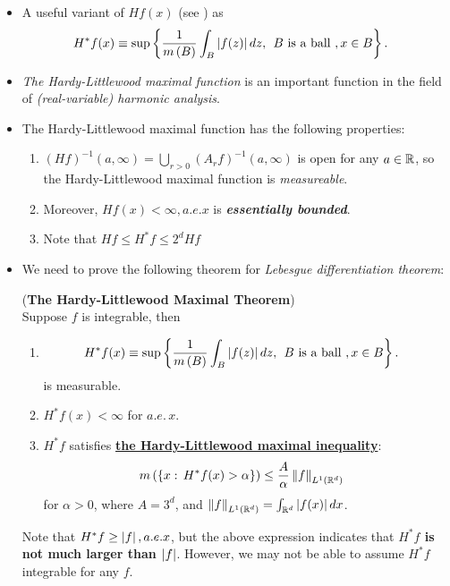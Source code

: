 \documentclass[11pt]{article}
\begin{document}
\begin{itemize}
\item \begin{remark}
 A useful variant of $Hf(x)$ (see \citep{stein2009real}) as 
\begin{align*}
H^{*}f(x) &\equiv \sup\left\{ \frac{1}{m\left(B\right)}\int_{B}\left\lvert f(z) \right\rvert dz, \;\, B\text{ is a ball }, x\in B  \right\}.
\end{align*}
\end{remark}

\item \begin{remark}
\emph{The Hardy-Littlewood maximal function} is an important function in the field of \emph{(real-variable) harmonic analysis}.
\end{remark}

\item \begin{remark} The Hardy-Littlewood maximal function has the following properties:
\begin{enumerate}
\item $(Hf)^{-1}(a, \infty) = \bigcup_{r>0}(A_{r}f)^{-1}(a,\infty)$ is open for any $a\in {\mathbb R}$, so the Hardy-Littlewood maximal function is \emph{measureable}. 
\item  Moreover, $Hf(x)<\infty, a.e. x$ is \emph{\textbf{essentially bounded}}.  
\item Note that $Hf \le H^{*}f \le 2^{d}Hf$
\end{enumerate}
\end{remark}

\item We need to prove the following theorem for \emph{Lebesgue differentiation theorem}:
\begin{theorem} (\textbf{The Hardy-Littlewood Maximal Theorem}) \citep{stein2009real, folland2013real}\\
Suppose $f$ is integrable, then 
\begin{enumerate}
\item \begin{align*}
H^{*}f(x) &\equiv \sup\left\{ \frac{1}{m\left(B\right)}\int_{B}\left\lvert f(z) \right\rvert dz, \;\, B\text{ is a ball }, x\in B  \right\}.
\end{align*} is measurable. 

\item $H^{*}f(x) <\infty$ for $a.e.\, x$.

\item  $H^{*}f$ satisfies \underline{\textbf{the Hardy-Littlewood maximal inequality}}:
\begin{align*}
m\left(\left\{x: \, H^{*}f(x)> \alpha\right\}\right) &\le \frac{A}{\alpha}\left\|f\right\|_{L^{1}({\mathbb R}^{d})}
\end{align*}
for $\alpha>0$, where $A= 3^{d}$, and $\left\|f\right\|_{L^{1}({\mathbb R}^{d})}= \int_{{\mathbb R}^{d}}\left\lvert f(x) \right\rvert dx$.
\end{enumerate}
Note that $H^{*}f \ge \left\lvert f \right\rvert, a.e. x$, but the above expression indicates that \textbf{$H^{*}f$ is not much larger than $\left\lvert f \right\rvert$}. However, we may not be able to assume $H^{*}f$ integrable for any $f$.
\end{theorem}


\end{itemize}
\end{document}
